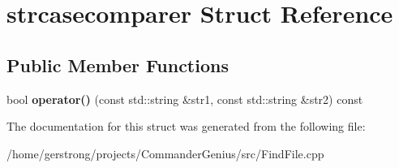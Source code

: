 \hypertarget{structstrcasecomparer}{
\section{strcasecomparer Struct Reference}
\label{structstrcasecomparer}
}
\subsection*{Public Member Functions}
\begin{DoxyCompactItemize}
\item 
\hypertarget{structstrcasecomparer_aec18cb58d5bfbfd143d5427bd568e38b}{
bool {\bfseries operator()} (const std::string \&str1, const std::string \&str2) const }
\label{structstrcasecomparer_aec18cb58d5bfbfd143d5427bd568e38b}

\end{DoxyCompactItemize}


The documentation for this struct was generated from the following file:\begin{DoxyCompactItemize}
\item 
/home/gerstrong/projects/CommanderGenius/src/FindFile.cpp\end{DoxyCompactItemize}
